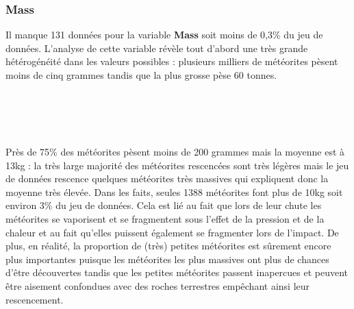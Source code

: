 \documentclass[12pt]{article}
\begin{document}
\subsubsection*{Mass}
Il manque 131 données pour la variable \textbf{Mass} soit moins de 0,3\% du jeu de données. L'analyse de cette variable révèle tout d'abord une très grande hétérogénéité dans les valeurs possibles : plusieurs milliers de météorites pèsent moins de cinq grammes tandis que la plus grosse pèse 60 tonnes.\\
\\
\\
\\
\\
Près de 75\% des météorites pèsent moins de 200 grammes mais la moyenne est à 13kg : la très large majorité des météorites rescencées sont très légères mais le jeu de données rescence quelques météorites très massives qui expliquent donc la moyenne très élevée. Dans les faits, seules 1388 météorites font plus de 10kg soit environ 3\% du jeu de données. Cela est lié au fait que lors de leur chute les météorites se vaporisent et se fragmentent sous l'effet de la pression et de la chaleur et au fait qu'elles puissent également se fragmenter lors de l'impact. De plus, en réalité, la proportion de (très) petites météorites est sûrement encore plus importantes puisque les météorites les plus massives ont plus de chances d'être découvertes tandis que les petites météorites passent inapercues et peuvent être aisement confondues avec des roches terrestres empêchant ainsi leur rescencement.
\end{document}
